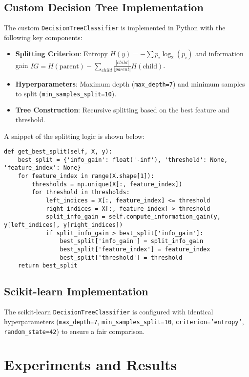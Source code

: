 \documentclass[a4paper,12pt]{article}
\begin{document}
\subsection{Custom Decision Tree Implementation}
The custom \texttt{DecisionTreeClassifier} is implemented in Python with the following key components:
\begin{itemize}
    \item \textbf{Splitting Criterion}: Entropy \( H(y) = -\sum p_i \log_2(p_i) \) and information gain \( IG = H(\text{parent}) - \sum_{child} \frac{|child|}{|parent|} H(\text{child}) \).
    \item \textbf{Hyperparameters}: Maximum depth (\texttt{max\_depth=7}) and minimum samples to split (\texttt{min\_samples\_split=10}).
    \item \textbf{Tree Construction}: Recursive splitting based on the best feature and threshold.
\end{itemize}

A snippet of the splitting logic is shown below:
\begin{lstlisting}
def get_best_split(self, X, y):
    best_split = {'info_gain': float('-inf'), 'threshold': None, 'feature_index': None}
    for feature_index in range(X.shape[1]):
        thresholds = np.unique(X[:, feature_index])
        for threshold in thresholds:
            left_indices = X[:, feature_index] <= threshold
            right_indices = X[:, feature_index] > threshold
            split_info_gain = self.compute_information_gain(y, y[left_indices], y[right_indices])
            if split_info_gain > best_split['info_gain']:
                best_split['info_gain'] = split_info_gain
                best_split['feature_index'] = feature_index
                best_split['threshold'] = threshold
    return best_split
\end{lstlisting}

\subsection{Scikit-learn Implementation}
The scikit-learn \texttt{DecisionTreeClassifier} is configured with identical hyperparameters (\texttt{max\_depth=7}, \texttt{min\_samples\_split=10}, \texttt{criterion='entropy'}, \texttt{random\_state=42}) to ensure a fair comparison.

\section{Experiments and Results}
\end{document}
